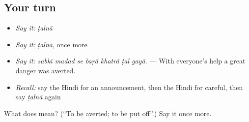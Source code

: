 \subsection*{Your turn}
\begin{itemize}
\raggedright
  \item \emph{Say it:} \emph{ṭalnā}
  \item \emph{Say it:} \emph{ṭalnā}, once more
  \item \emph{Say it:} \emph{sabkī madad se baṛā khatrā ṭal gayā.} — With everyone's help a great danger was averted.
  \item \emph{Recall:} say the Hindi for an announcement, then the Hindi for careful, then say \emph{ṭalnā} again
\end{itemize}

\begin{tcolorbox}[breakable,colback=teal!4,colframe=teal!35!black,title={Before you move on}]
What does  mean? (\textquotedblleft{}To be averted; to be put off\textquotedblright{}.) Say it once more.
\end{tcolorbox}

